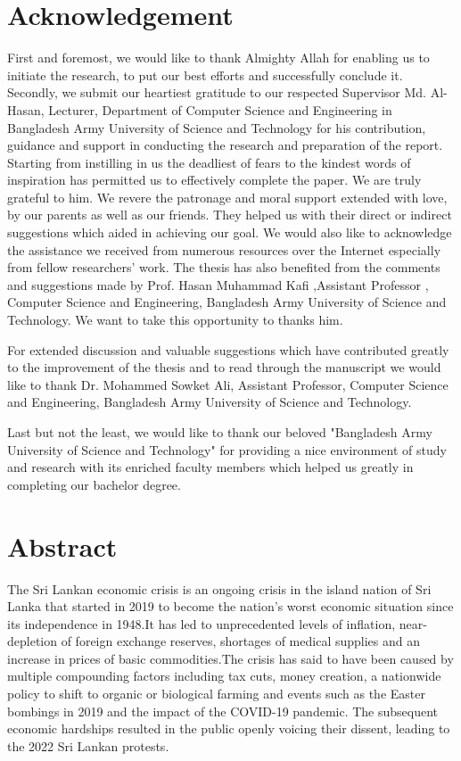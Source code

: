\documentclass[a4paper,12pt]{article}
\begin{document}
\section{Acknowledgement}
\vspace*{-0.7cm}
\justifying
\large
First and foremost, we would like to thank Almighty Allah for enabling us to initiate the research, to put our best efforts and successfully conclude it. Secondly, we submit our heartiest gratitude to our respected Supervisor Md. Al-Hasan, Lecturer, Department of Computer Science and Engineering in Bangladesh Army University of Science and Technology for his contribution, guidance and support in conducting the research and preparation of the report. Starting from instilling in us the deadliest of fears to the kindest words of inspiration has permitted us to effectively complete the paper. We are truly grateful to him. We revere the patronage and moral support extended with love, by our parents as well as our friends. They helped us with their direct or indirect suggestions which aided in achieving our goal. We would also like to acknowledge the assistance we received from numerous resources over the Internet especially from fellow researchers’ work.
The thesis has also benefited from the comments and suggestions made by Prof. Hasan Muhammad Kafi ,Assistant Professor , Computer Science and Engineering, Bangladesh Army University of Science and Technology. We want to take this opportunity to thanks him.

For extended discussion and valuable suggestions which have contributed greatly to the improvement of the thesis and to read through the manuscript we would like to thank 
Dr. Mohammed Sowket Ali, Assistant Professor, Computer Science and Engineering, Bangladesh Army University of Science and Technology.

Last but not the least, we would like to thank our beloved "Bangladesh Army University of Science and Technology" for providing a nice environment of study and research with its enriched faculty members which helped us greatly in completing our bachelor degree. 




\newpage
\vspace*{-1cm}\section*{Abstract}
\justifying
The Sri Lankan economic crisis is an ongoing crisis in the island nation of Sri Lanka that started in 2019 to become the nation's worst economic situation since its independence in 1948.It has led to unprecedented levels of inflation, near-depletion of foreign exchange reserves, shortages of medical supplies and an increase in prices of basic commodities.The crisis has said to have been caused by multiple compounding factors including tax cuts, money creation, a nationwide policy to shift to organic or biological farming and events such as the Easter bombings in 2019 and the impact of the COVID-19 pandemic. The subsequent economic hardships resulted in the public openly voicing their dissent, leading to the 2022 Sri Lankan protests.
\end{document}
